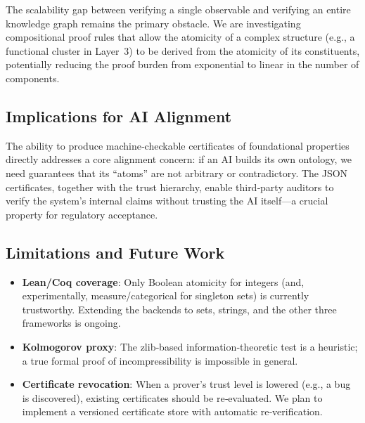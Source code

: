 The scalability gap between verifying a single observable and verifying an
entire knowledge graph remains the primary obstacle.  We are investigating
compositional proof rules that allow the atomicity of a complex structure
(e.g., a functional cluster in Layer~3) to be derived from the atomicity
of its constituents, potentially reducing the proof burden from exponential
to linear in the number of components.

\subsection{Implications for AI Alignment}

The ability to produce machine‑checkable certificates of foundational
properties directly addresses a core alignment concern: if an AI builds its
own ontology, we need guarantees that its ``atoms'' are not arbitrary or
contradictory.  The JSON certificates, together with the trust hierarchy,
enable third‑party auditors to verify the system's internal claims without
trusting the AI itself—a crucial property for regulatory acceptance.

\subsection{Limitations and Future Work}

\begin{itemize}
    \item \textbf{Lean/Coq coverage}: Only Boolean atomicity for integers
          (and, experimentally, measure/categorical for singleton sets) is
          currently trustworthy.  Extending the backends to sets, strings,
          and the other three frameworks is ongoing.
    \item \textbf{Kolmogorov proxy}: The zlib‑based information‑theoretic
          test is a heuristic; a true formal proof of incompressibility is
          impossible in general.
    \item \textbf{Certificate revocation}: When a prover's trust level is
          lowered (e.g., a bug is discovered), existing certificates should
          be re‑evaluated.  We plan to implement a versioned certificate
          store with automatic re‑verification.
\end{itemize}
